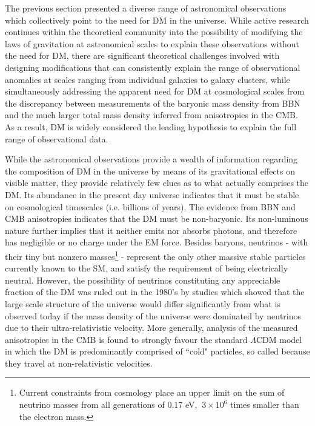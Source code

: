The previous section presented a diverse range of astronomical observations which collectively point to the need for DM in the universe. While active research continues within the theoretical community \cite{mond_2012, mond_2021} into the possibility of modifying the laws of gravitation at astronomical scales to explain these observations without the need for DM, there are significant theoretical challenges involved with designing modifications that can consistently explain the range of observational anomalies at scales ranging from individual galaxies to galaxy clusters, while simultaneously addressing the apparent need for DM at cosmological scales from the discrepancy between measurements of the baryonic mass density from BBN and the much larger total mass density inferred from anisotropies in the CMB. As a result, DM is widely considered the leading hypothesis to explain the full range of observational data.

While the astronomical observations provide a wealth of information regarding the composition of DM in the universe by means of its gravitational effects on visible matter, they provide relatively few clues as to what actually comprises the DM. Its abundance in the present day universe indicates that it must be stable on cosmological timescales (i.e. billions of years). The evidence from BBN and CMB anisotropies indicates that the DM must be non-baryonic. Its non-luminous nature further implies that it neither emits nor absorbs photons, and therefore has negligible or no charge under the EM force. Besides baryons, neutrinos - with their tiny but nonzero masses\footnote{Current constraints from cosmology place an upper limit on the sum of neutrino masses from all generations of 0.17 eV, \(~3\times10^6\) times smaller than the electron mass.} - represent the only other massive stable particles currently known to the SM, and satisfy the requirement of being electrically neutral. However, the possibility of neutrinos constituting any appreciable fraction of the DM was ruled out in the 1980's by studies \cite{neutrino_dm} which showed that the large scale structure of the universe would differ significantly from what is observed today if the mass density of the universe were dominated by neutrinos due to their ultra-relativistic velocity. More generally, analysis of the measured anisotropies in the CMB \cite{Planck_2020} is found to strongly favour the standard \(\Lambda\)CDM model in which the DM is predominantly comprised of ``cold" particles, so called because they travel at non-relativistic velocities.

